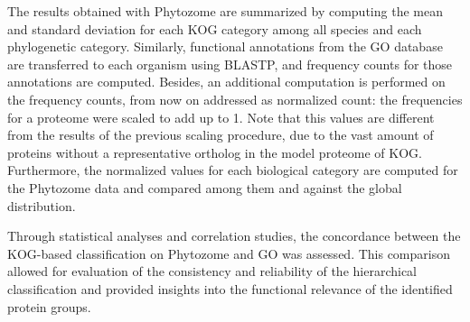 The results obtained with Phytozome are summarized by 
computing the mean and standard deviation for each KOG 
category among all species and each phylogenetic category. 
Similarly, functional annotations from the GO database are 
transferred to each organism using BLASTP, and frequency 
counts for those annotations are computed. Besides, an 
additional computation is performed on the frequency counts, 
from now on addressed as normalized count: the frequencies 
for a proteome were scaled to add up to 1. Note that this 
values are different from the results of the previous 
scaling procedure, due to the vast amount of proteins 
without a representative ortholog in the model proteome 
of KOG. Furthermore, the normalized values for each 
biological category are computed for the Phytozome data and
compared among them and against the global distribution.

Through statistical analyses and correlation studies, the 
concordance between the KOG-based classification on Phytozome 
and GO was assessed. This comparison allowed for 
evaluation of the consistency and reliability of the 
hierarchical classification and provided insights into the 
functional relevance of the identified protein groups.
